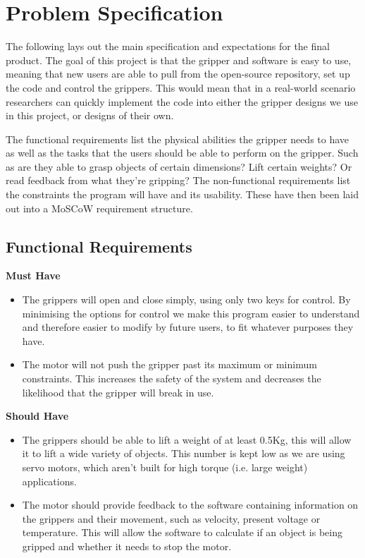 \documentclass{l4proj}
\begin{document}
\section{Problem Specification}
The following lays out the main specification and expectations for the final product. The goal of this project is that the gripper and software is easy to use, meaning that new users are able to pull from the open-source repository, set up the code and control the grippers. This would mean that in a real-world scenario researchers can quickly implement the code into either the  gripper designs we use in this project, or designs of their own. 

The functional requirements list the physical abilities the gripper needs to have as well as the tasks that the users should be able to perform on the gripper. Such as are they able to grasp objects of certain dimensions? Lift certain weights? Or read feedback from what they're gripping? The non-functional requirements list the constraints the program will have and its usability. These have then been laid out into a MoSCoW requirement structure.

\subsection{Functional Requirements}

\textbf{Must Have}
\begin{itemize}
	\item The grippers will open and close simply, using only two keys for control. By minimising the options for control we make this program easier to understand and therefore easier to modify by future users, to fit whatever purposes they have. 
	\item The motor will not push the gripper past its maximum or minimum constraints. This increases the safety of the system and decreases the likelihood that the gripper will break in use. 
	
\end{itemize}
\textbf{Should Have}
\begin{itemize}
	\item The grippers should be able to lift a weight of at least 0.5Kg, this will allow it to lift a wide variety of objects. This number is kept low as we are using servo motors, which aren't built for high torque (i.e. large weight) applications. 
	\item The motor should provide feedback to the software containing information on the grippers and their movement, such as velocity, present voltage or temperature. This will allow the software to calculate if an object is being gripped and whether it needs to stop the motor. 
\end{itemize}
\end{document}

